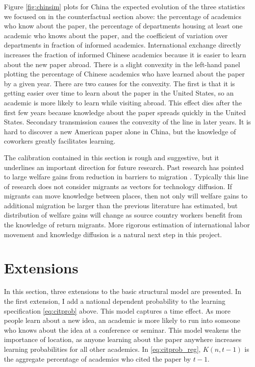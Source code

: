 \documentclass[]{article}
\begin{document}
Figure \ref{fig:chinsim} plots for China the expected evolution of the three 
statistics we focused on in the counterfactual section above: the percentage of academics
who know about the paper, the percentage of departments housing at least one academic 
who knows about the paper, and the coefficient of variation over departments in fraction 
of informed academics.  International exchange
 directly increases the fraction of informed Chinese academics because it is
 easier to learn about the new paper abroad.  There is a slight convexity in the 
left-hand panel plotting the percentage of Chinese academics who have learned about
the paper by a given year.
There are two causes for the convexity.  The first is that it is getting easier 
over time to learn about the paper in the United States, so an academic is more likely
to learn while visiting abroad.  This effect dies after the first few years because
knowledge about the paper spreads quickly in the United States.  Secondary transmission
causes the convexity of the line in later years.  It is hard
to discover a new American paper alone in China, but the knowledge of coworkers greatly
facilitates learning.

The calibration contained in this section is rough and suggestive, but it underlines an important
 direction for future research.  Past research has pointed to large welfare gains from
reduction in barriers to migration \citep{clemens2011economics}.  Typically this
 line of research does not consider migrants as vectors for technology diffusion.  If migrants 
can move knowledge between places, then not only will welfare gains to additional
migration be larger than the previous literature has estimated, but distribution of welfare gains 
will change as source country workers benefit from the knowledge
of return migrants.  More rigorous estimation of international labor movement and
 knowledge diffusion is a natural next step in this project.

\section{Extensions}
\label{sec:extensions}

In this section, three extensions to the basic structural model are
presented. In the first extension, I add a national dependent probability
to the learning specification \eqref{eq:citprob} above. This model
captures a time effect.  As more people learn about a new idea, an academic is more likely to run into
someone who knows about the idea at a conference or seminar. This model weakens the importance of location,
as anyone learning about the paper anywhere increases learning probabilities for all other academics.  In
\eqref{eq:citprob_reg}, $K(n,t-1)$ is the aggregate percentage of academics who cited the paper by $t-1$.
\end{document}
